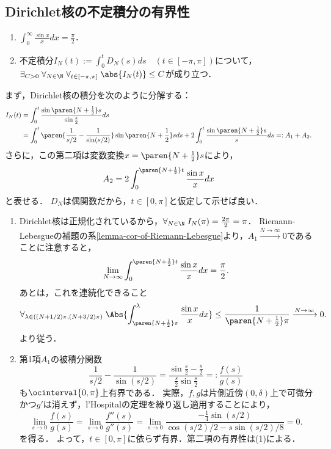 \documentclass[uplatex,dvipdfmx]{jsreport}
\begin{document}
\subsection{Dirichlet核の不定積分の有界性}

\begin{lemma}\mbox{}\label{lemma-boundedness-of-integral-of-Dirichlet-kernel}
    \begin{enumerate}
        \item $\int^\infty_0\frac{\sin x}{x}dx=\frac{\pi}{2}$．
        \item 不定積分$I_N(t):=\int^t_0D_N(s)ds\quad(t\in[-\pi,\pi])$について，$\exists_{C>0}\;\forall_{N\in\N}\;\forall_{t\in[-\pi,\pi]}\;\abs{I_N(t)}\le C$が成り立つ．
    \end{enumerate}
\end{lemma}
\begin{Proof}
    まず，Dirichlet核の積分を次のように分解する：
    \begin{align*}
        I_N(t)&=\int^t_0\frac{\sin\paren{N+\frac{1}{2}}s}{\sin\frac{s}{2}}ds\\
        &=\int^t_0\paren{\frac{1}{s/2}-\frac{1}{\sin(s/2)}}\sin\paren{N+\frac{1}{2}}sds+2\int^t_0\frac{\sin\paren{N+\frac{1}{2}}s}{s}ds=:A_1+A_2.
    \end{align*}
    さらに，この第二項は変数変換$x=\paren{N+\frac{1}{2}}s$により，
    \[A_2=2\int^{\paren{N+\frac{1}{2}}t}_0\frac{\sin x}{x}dx\]
    と表せる．
    $D_N$は偶関数だから，$t\in[0,\pi]$と仮定して示せば良い．
    \begin{enumerate}
        \item Dirichlet核は正規化されているから，$\forall_{N\in\N}\;I_N(\pi)=\frac{2\pi}{2}=\pi$．
        Riemann-Lebesgueの補題の系\ref{lemma-cor-of-Riemann-Lebesgue}より，$A_1\xrightarrow{N\to\infty}0$であることに注意すると，
        \[\lim_{N\to\infty}\int^{\paren{N+\frac{1}{2}}t}_0\frac{\sin x}{x}dx=\frac{\pi}{2}.\]
        あとは，これを連続化できること
        \[\forall_{\lambda\in((N+1/2)\pi,(N+3/2)\pi)}\;\Abs{\int^\lambda_{\paren{N+\frac{1}{2}}\pi}\frac{\sin x}{x}dx}\le\frac{1}{\paren{N+\frac{1}{2}}\pi}\xrightarrow{N\to\infty}0.\]
        より従う．
        \item 第1項$A_1$の被積分関数
        \[\frac{1}{s/2}-\frac{1}{\sin(s/2)}=\frac{\sin\frac{s}{2}-\frac{s}{2}}{\frac{s}{2}\sin\frac{s}{2}}=:\frac{f(s)}{g(s)}\]
        も$\ocinterval{0,\pi}$上有界である．
        実際，$f,g$は片側近傍$(0,\delta)$上で可微分かつ$g'$は消えず，l'Hospitalの定理を繰り返し適用することにより，
        \[\lim_{s\to0}\frac{f(s)}{g(s)}=\lim_{s\to0}\frac{f''(s)}{g''(s)}=\lim_{s\to0}\frac{-\frac{1}{4}\sin(s/2)}{\cos(s/2)/2-s\sin(s/2)/8}=0.\]
        を得る．
        よって，$t\in[0,\pi]$に依らず有界．第二項の有界性は(1)による．
    \end{enumerate}
\end{Proof}
\end{document}
